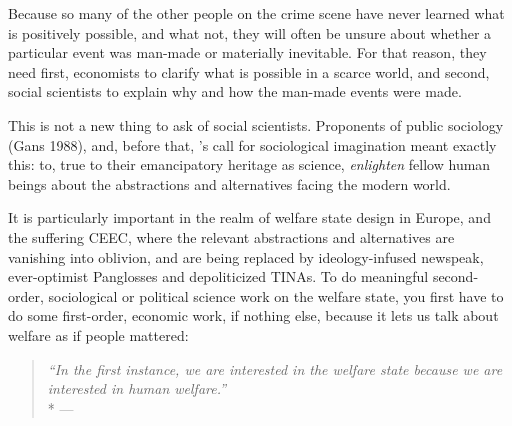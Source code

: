 Because so many of the other people on the crime scene have never learned what is positively possible, and what not, they will often be unsure about whether a particular event was man-made or materially inevitable.
For that reason, they need first, economists to clarify what is possible in a scarce world, and second, social scientists to explain why and how the man-made events were made.

This is not a new thing to ask of social scientists.
Proponents of public sociology (Gans 1988), and, before that, \citeauthor{Mills-1959-aa}'s call for sociological imagination meant exactly this:
to, true to their emancipatory heritage as science, \emph{enlighten} fellow human beings about the abstractions and alternatives facing the modern world.

It is particularly important in the realm of welfare state design in Europe, and the suffering \gls{CEEC}, where the relevant abstractions and alternatives are vanishing into oblivion, and are being replaced by ideology-infused newspeak, ever-optimist Panglosses and depoliticized TINAs.
To do meaningful second-order, sociological or political science work on the welfare state, you first have to do some first-order, economic work, if nothing else, because it lets us talk about welfare as if people mattered:
\begin{quote}
	\emph{``In the first instance, we are interested in the welfare state because we are interested in human welfare.''}
	\\*
	--- \citet*[236]{Haggard2009}
\end{quote}

